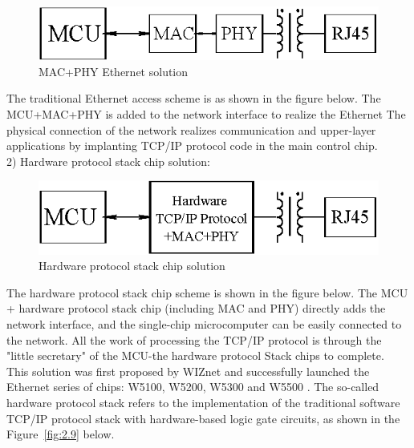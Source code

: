 \begin{figure}[!ht]
	\centering
	\includegraphics {grafiken/2.7.eps}
	\caption{MAC+PHY Ethernet solution} 
	\label{fig:2.7}
\end{figure}
\FloatBarrier
The traditional Ethernet access scheme is as shown in the figure below. The MCU+MAC+PHY is added to the network interface to realize the Ethernet
The physical connection of the network realizes communication and upper-layer applications by implanting TCP/IP protocol code in the main control chip.
\\
2) Hardware protocol stack chip solution: 
\begin{figure}[!ht]
	\centering
	\includegraphics {grafiken/2.8.eps}
	\caption{Hardware protocol stack chip solution} 
	\label{fig:2.8}
\end{figure}
\FloatBarrier
The hardware protocol stack chip scheme is shown in the figure below. The MCU + hardware protocol stack chip (including MAC and PHY) directly adds the network interface, and the single-chip microcomputer can be easily connected to the network. All the work of processing the TCP/IP protocol is through the "little secretary" of the MCU-the hardware protocol Stack chips to complete.
\\
This solution was first proposed by WIZnet and successfully launched the Ethernet series of chips: W5100, W5200, W5300 and W5500 \cite{khanchuea2019multi}. The so-called hardware protocol stack refers to the implementation of the traditional software TCP/IP protocol stack with hardware-based logic gate circuits, as shown in the Figure~\ref{fig:2.9} below.
